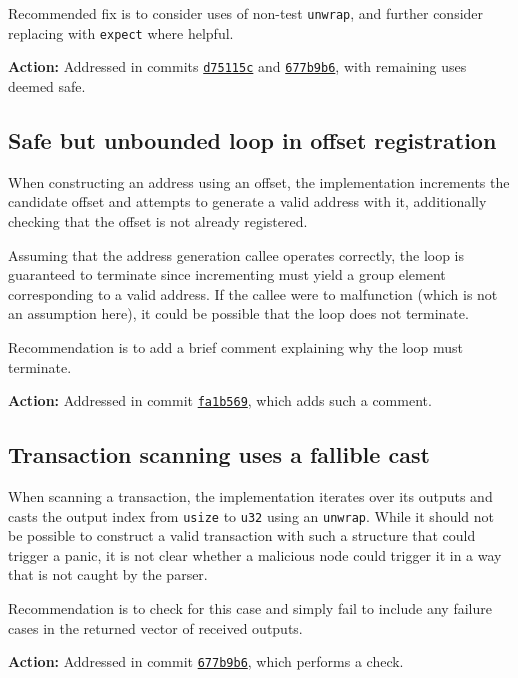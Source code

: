 \documentclass{article}
\begin{document}
Recommended fix is to consider uses of non-test \texttt{unwrap}, and further consider replacing with \texttt{expect} where helpful.

\textbf{Action:} Addressed in commits \href{https://github.com/serai-dex/serai/commit/d75115ce1396949e17c87be6ffab886c2ee5a975}{\texttt{d75115c}} and \href{https://github.com/serai-dex/serai/commit/677b9b681f5e2819fe34599beb0947adc22afabd}{\texttt{677b9b6}}, with remaining uses deemed safe.


\subsection{Safe but unbounded loop in offset registration}

When constructing an address using an offset, the implementation increments the candidate offset and attempts to generate a valid address with it, additionally checking that the offset is not already registered.

Assuming that the address generation callee operates correctly, the loop is guaranteed to terminate since incrementing must yield a group element corresponding to a valid address.
If the callee were to malfunction (which is not an assumption here), it could be possible that the loop does not terminate.

Recommendation is to add a brief comment explaining why the loop must terminate.

\textbf{Action:} Addressed in commit \href{https://github.com/serai-dex/serai/commit/fa1b569b78890cc5edb22dce91f08acd64cef854}{\texttt{fa1b569}}, which adds such a comment.


\subsection{Transaction scanning uses a fallible cast}

When scanning a transaction, the implementation iterates over its outputs and casts the output index from \texttt{usize} to \texttt{u32} using an \texttt{unwrap}.
While it should not be possible to construct a valid transaction with such a structure that could trigger a panic, it is not clear whether a malicious node could trigger it in a way that is not caught by the parser.

Recommendation is to check for this case and simply fail to include any failure cases in the returned vector of received outputs.

\textbf{Action:} Addressed in commit \href{https://github.com/serai-dex/serai/commit/677b9b681f5e2819fe34599beb0947adc22afabd}{\texttt{677b9b6}}, which performs a check.
\end{document}
